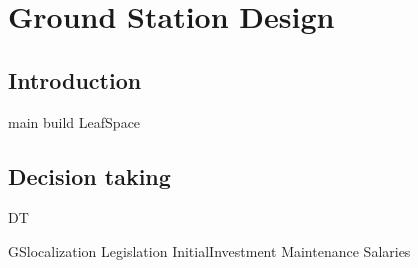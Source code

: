 \chapter{Ground Station Design}
\section{Introduction}
{main}
{build}
{LeafSpace}
\section{Decision taking}
{DT}

{GSlocalization}
{Legislation}
{InitialInvestment}
{Maintenance}
{Salaries}
%
%
